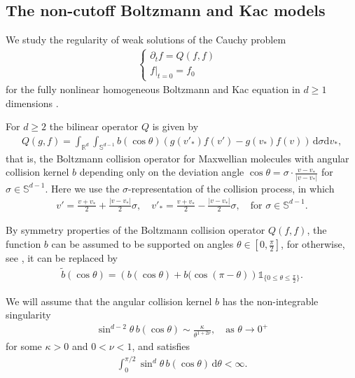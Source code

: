 \documentclass[11pt,a4paper,reqno]{amsart}
\theoremstyle{plain}
\theoremstyle{definition}
\begin{document}
   	
\subsection{The non-cutoff Boltzmann and Kac models}
We study the regularity of weak solutions of the Cauchy problem
\begin{align}\label{eq:cauchyproblem}	
\begin{cases}
\partial_t f = Q(f,f) & \\
f|_{t=0} = f_0 &
\end{cases}
\end{align}
for the fully nonlinear homogeneous Boltzmann and Kac equation in $d\geq 1$ dimensions \cite{Bol72,Kac59}.

For $d\geq 2$ the bilinear operator $Q$ is given by
\begin{align}\label{eq:Boltzmann-kernel}
	Q(g,f) = \int_{{\mathbb{R}}^d} \int_{{\mathbb{S}}^{d-1}} b(\cos\theta) \left( g(v'_*) f(v') - g(v_*) f(v) \right) \, \mathrm{d}\sigma \mathrm{d} v_*,
\end{align}
that is, the Boltzmann collision operator for Maxwellian molecules with angular collision kernel $b$ depending only on the deviation angle $\cos\theta = \sigma \cdot \frac{v-v_*}{|v-v_*|}$ for $\sigma\in\mathbb{S}^{d-1}$. Here we use the $\sigma$-representation of the collision process, in which
\begin{align*}
	v' = \frac{v+v_*}{2} + \frac{|v-v_*|}{2}\sigma, \quad v'_* = \frac{v+v_*}{2} - \frac{|v-v_*|}{2}\sigma, \quad \text{for } \sigma \in {\mathbb{S}}^{d-1}.
\end{align*}

By symmetry properties of the Boltzmann collision operator $Q(f,f)$, the function $b$ can be assumed to be supported on angles $\theta \in [0, \frac{\pi}{2}]$, for otherwise, see \cite{Vil02}, it can be replaced by
	\begin{align*}
	\widetilde{b}(\cos\theta) = \left( b(\cos\theta) + b(\cos(\pi-\theta) \right) {\mathds{1}}_{\{0\leq \theta\leq \frac{\pi}{2}\}}.
	\end{align*}

We will assume that the angular collision kernel $b$ has the non-integrable singularity
\begin{align}
	\label{eq:cross-section} \sin^{d-2}\theta \, b(\cos\theta) \sim \frac{\kappa}{\theta^{1+2\nu}},\quad \text{as } \theta\to 0^+
\end{align}
for some $\kappa>0$ and $0 < \nu <1$, and satisfies
\begin{align}\label{eq:cross-section2}
	\int_0^{\pi/2} \sin^d\theta \, b(\cos\theta)\,\mathrm{d}\theta <\infty.
\end{align}
\end{document}
